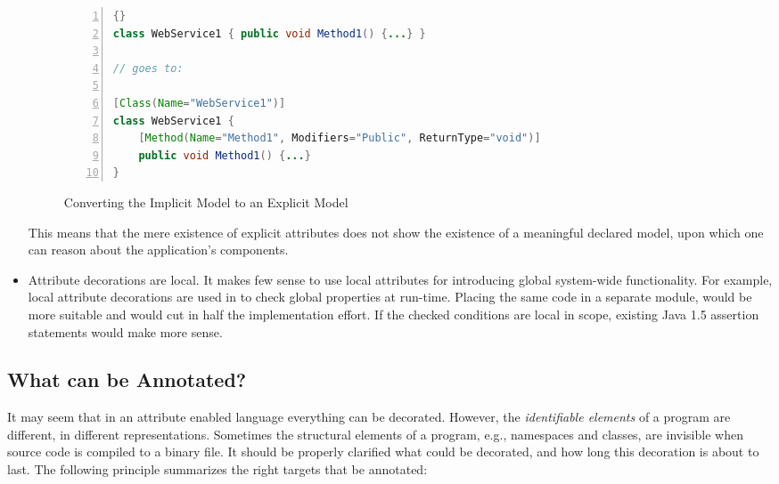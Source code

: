 \begin{itemize}
\begin{figure}[ht]
\begin{center}
\begin{minipage}[t]{8cm}
		\begin{scriptsize}
		\begin{lstlisting}[numbers=left,language=Java,frame=leftline]{}
class WebService1 { public void Method1() {...} }
 
// goes to:

[Class(Name="WebService1")]
class WebService1 {
    [Method(Name="Method1", Modifiers="Public", ReturnType="void")]
    public void Method1() {...}
}
\end{lstlisting}
		\end{scriptsize}
		\end{minipage}
	\end{center}
	\caption{Converting the Implicit Model to an Explicit Model}
	\label{fig:convert}
\end{figure}

This means that the mere existence of explicit attributes does not show the existence of a meaningful declared model, upon which one can reason about the application's components.

\item Attribute decorations are local. It makes few sense to use local attributes for introducing global system-wide functionality. For example, local attribute decorations are used in \cite{bodden.04} to check global properties at run-time. Placing the same code in a separate module, would be more suitable and would cut in half the implementation effort. If the checked conditions are local in scope, existing Java 1.5 assertion statements would make more sense.

\end{itemize}

\subsection{What can be Annotated?}
\label{when.annotate}

It may seem that in an attribute enabled language everything can be decorated. However, the \textit{identifiable elements} of a program are different, in different representations. Sometimes the structural elements of a program, e.g., namespaces and classes, are invisible when source code is compiled to a binary file. It should be properly clarified what could be decorated, and how long this decoration is about to last. The following principle summarizes the right targets that be annotated:

